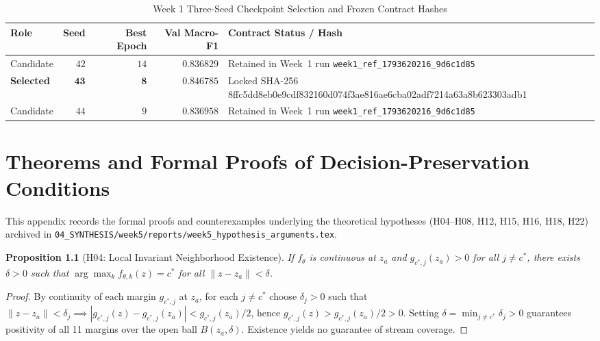 \documentclass[11pt,oneside,a4paper]{report}
\newcommand{\abs}[1]{\left\lvert #1\right\rvert}
\newcommand{\code}[1]{{\small\upshape\ttfamily #1}}
\newcommand{\pathcode}[1]{{\small\upshape\ttfamily\nolinkurl{#1}}}
\newtheorem{proposition}[definition]{Proposition}
\theoremstyle{remark}
\begin{document}
\begin{table}[htbp]
\centering\small
\caption{Week 1 Three-Seed Checkpoint Selection and Frozen Contract Hashes}
\label{tab:app_seeds}
\begin{tabularx}{\textwidth}{@{}lrrrY@{}}
\toprule
\textbf{Role} & \textbf{Seed} & \textbf{Best Epoch} & \textbf{Val Macro-F1} & \textbf{Contract Status / Hash} \\
\midrule
Candidate & $42$ & $14$ & $0.836829$ & Retained in Week~1 run \pathcode{week1_ref_1793620216_9d6c1d85} \\
\textbf{Selected} & $\mathbf{43}$ & $\mathbf{8}$ & $\mathbf{0.846785}$ & Locked SHA-256 \code{8ffc5dd8eb0e9cdf832160d074f3ae81\allowbreak 6ae6cba02adf7214a63a8b623303adb1} \\
Candidate & $44$ & $9$ & $0.836958$ & Retained in Week~1 run \pathcode{week1_ref_1793620216_9d6c1d85} \\
\bottomrule
\end{tabularx}
\end{table}

\chapter{Theorems and Formal Proofs of Decision-Preservation Conditions}
\label{app:proofs}

This appendix records the formal proofs and counterexamples underlying the theoretical hypotheses (\code{H04}--\code{H08}, \code{H12}, \code{H15}, \code{H16}, \code{H18}, \code{H22}) archived in \nolinkurl{04_SYNTHESIS/week5/reports/week5_hypothesis_arguments.tex}.

\begin{proposition}[\code{H04}: Local Invariant Neighborhood Existence]
If $f_\theta$ is continuous at $z_a$ and $g_{c^*,j}(z_a) > 0$ for all $j \neq c^*$, there exists $\delta > 0$ such that $\arg\max_k f_{\theta,k}(z) = c^*$ for all $\|z - z_a\| < \delta$.
\end{proposition}
\begin{proof}
By continuity of each margin $g_{c^*,j}$ at $z_a$, for each $j \neq c^*$ choose $\delta_j > 0$ such that $\|z - z_a\| < \delta_j \implies \abs{g_{c^*,j}(z) - g_{c^*,j}(z_a)} < g_{c^*,j}(z_a)/2$, hence $g_{c^*,j}(z) > g_{c^*,j}(z_a)/2 > 0$. Setting $\delta = \min_{j \neq c^*} \delta_j > 0$ guarantees positivity of all 11 margins over the open ball $B(z_a, \delta)$. Existence yields no guarantee of stream coverage.
\end{proof}
\end{document}
